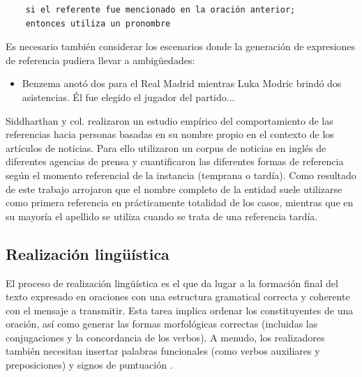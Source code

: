 \begin{verbatim}
    si el referente fue mencionado en la oración anterior;
    entonces utiliza un pronombre
\end{verbatim}

Es necesario también considerar los escenarios donde la generaci\'on de expresiones de referencia pudiera llevar a ambigüedades:

\begin{itemize}
    \item Benzema anotó dos para el Real Madrid mientras Luka Modric brindó dos asistencias. Él fue elegido el jugador del partido... 
\end{itemize}

    Siddharthan y col.  realizaron un estudio emp\'irico del comportamiento de las referencias hacia personas basadas en 
su nombre propio en el contexto de los art\'iculos de noticias. Para ello utilizaron un corpus de noticias en inglés de diferentes agencias de prensa y 
cuantificaron las diferentes formas de referencia seg\'un el momento referencial de la instancia (temprana o tard\'ia). Como resultado de este trabajo 
arrojaron que el nombre completo de la entidad suele utilizarse como primera referencia en pr\'acticamente totalidad de los casos, mientras que en su mayor\'ia
el apellido se utiliza cuando se trata de una referencia tard\'ia. 


\subsection{Realización lingüística}\label{subsection:realizcion}

    El proceso de realizaci\'on lingüística es el que da lugar a la formaci\'on final del texto expresado en oraciones con una 
estructura gramatical correcta y coherente con el mensaje a transmitir. Esta tarea implica ordenar los constituyentes de una oración, 
así como generar las formas morfológicas correctas (incluidas las conjugaciones y la concordancia de los verbos). A menudo, los 
realizadores también necesitan insertar palabras funcionales (como verbos auxiliares y preposiciones) y signos de puntuación .
   
